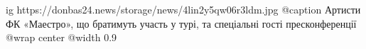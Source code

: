  
 
 
 
 

\ifcmt
  ig https://donbas24.news/storage/news/4lin2y5qw06r3ldm.jpg
	@caption Артисти ФК «Маестро», що братимуть участь у турі, та спеціальні гості пресконференції
  @wrap center
  @width 0.9
\fi
